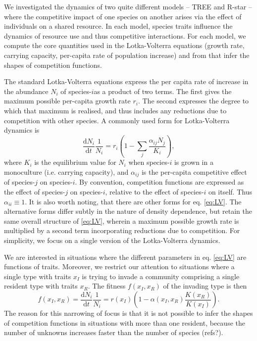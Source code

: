 \documentclass[a4paper,11pt]{article}
\newcommand{\ud}{\ensuremath{\mathrm{d}}}
\begin{document}

We investigated the dynamics of two quite different models -- TREE and R-star
-- where the competitive impact of one species on another arises via the
effect of individuals on a shared resource. In each model, species traits
influence the dynamics of resource use and thus competitive interactions. For
each model, we compute the core quantities used in the Lotka-Volterra
equations (growth rate, carrying capacity,  per-capita rate of population
increase) and from that infer the shapes of competition functions.

The standard Lotka-Volterra equations express the per capita rate of increase
in the abundance $N_i$ of species-$i$as a product of two terms. The first
gives the maximum possible per-capita growth rate $r_i$. The second expresses
the degree to which that maximum is realised, and thus includes any reductions
due to competition with other species. A commonly used form for Lotka-Volterra dynamics
is
\begin{equation}
\label{eq:LV}
\frac{\ud N_i}{\ud t} \frac{1}{N_i} =  r_i \left(1 - \sum_j
                                      \frac{\alpha_{ij} N_j}{K_i}\right),
\end{equation}
where $K_i$ is the equilibrium value for $N_i$ when species-$i$ is grown in a
monoculture  (i.e. carrying capacity), and $\alpha_{ij}$ is the per-capita
competitive effect of species-$j$ on species-$i$. By convention, competition
functions are expressed as the effect of species-$j$ on species-$i$, relative
to the effect of species-$i$ on itself. Thus $\alpha_{ii}\equiv 1$. It is
also worth noting, that there are other forms for eq. \ref{eq:LV}. The alternative
forms differ subtly in the nature of density dependence, but retain the same
overall structure of \ref{eq:LV}, wherein a maximum possible growth rate is multiplied
by a second term incorporating reductions due to competition. For simplicity,
we focus on a single version of the Lotka-Volterra dynamics.

We are interested in situations where the different parameters in eq.
\ref{eq:LV} are functions  of traits. Moreover, we restrict our
attention to situations where a single type with traits
$x_I$ is trying to invade a community comprising a single resident type with
traits $x_R$.  The fitness $f(x_I, x_R)$ of the invading type is
then
\begin{equation}
  \label{eq:LVi}
   f(x_I, x_R) = \frac{\ud N_i}{\ud t} \frac{1}{N_i} =
    r(x_I)\left(1 - \alpha(x_I, x_R) \frac{K(x_R)}{K(x_I)}\right).
\end{equation}
The reason for this narrowing of focus is that it is not possible to
infer the shapes of competition functions in situations with more than one
resident, because the number of unknowns increases faster than the number of
species (refs?).
\end{document}
